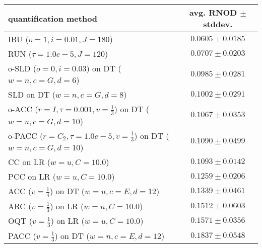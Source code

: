 \begin{tabular}{lc}
  \toprule
  quantification method & avg. RNOD $\pm$ stddev. \\
  \midrule
  IBU ($o=1, i=0.01, J=180$) & $\mathbf{0.0605 \pm 0.0185}$ \\
  RUN ($\tau=1.0e-5, J=120$) & $0.0707 \pm 0.0203$ \\
  o-SLD ($o=0, i=0.03$) on DT ($w=n, c=G, d=6$) & $0.0985 \pm 0.0281$ \\
  SLD on DT ($w=n, c=G, d=8$) & $0.1002 \pm 0.0291$ \\
  o-ACC ($r=I, \tau=0.001, v=\frac{1}{3}$) on DT ($w=u, c=G, d=10$) & $0.1067 \pm 0.0353$ \\
  o-PACC ($r=C_2, \tau=1.0e-5, v=\frac{1}{3}$) on DT ($w=n, c=G, d=10$) & $0.1090 \pm 0.0499$ \\
  CC on LR ($w=u, C=10.0$) & $0.1093 \pm 0.0142$ \\
  PCC on LR ($w=u, C=10.0$) & $0.1259 \pm 0.0206$ \\
  ACC ($v=\frac{1}{4}$) on DT ($w=u, c=E, d=12$) & $0.1339 \pm 0.0461$ \\
  ARC ($v=\frac{1}{3}$) on LR ($w=n, C=10.0$) & $0.1512 \pm 0.0603$ \\
  OQT ($v=\frac{1}{3}$) on LR ($w=u, C=10.0$) & $0.1571 \pm 0.0356$ \\
  PACC ($v=\frac{1}{3}$) on DT ($w=n, c=E, d=12$) & $0.1837 \pm 0.0548$ \\
  \bottomrule
\end{tabular}
